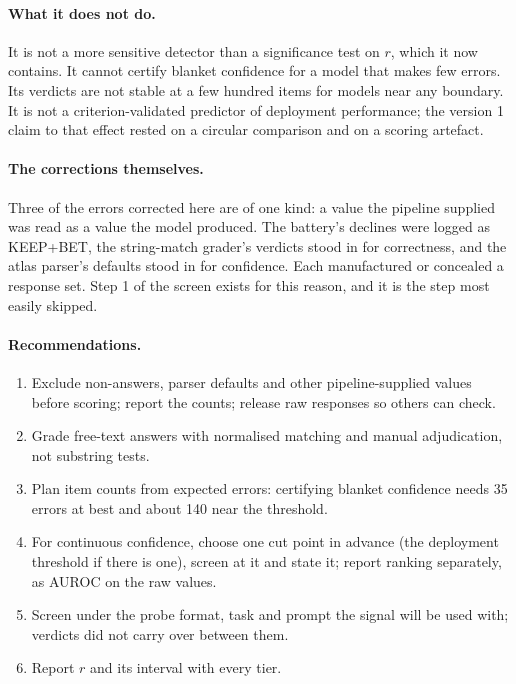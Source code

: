 \documentclass[11pt,a4paper]{article}
\begin{document}
\paragraph{What it does not do.} It is not a more sensitive detector than a significance test on $r$, which it now contains. It cannot certify blanket confidence for a model that makes few errors. Its verdicts are not stable at a few hundred items for models near any boundary. It is not a criterion-validated predictor of deployment performance; the version 1 claim to that effect rested on a circular comparison and on a scoring artefact.

\paragraph{The corrections themselves.} Three of the errors corrected here are of one kind: a value the pipeline supplied was read as a value the model produced. The battery's declines were logged as KEEP+BET, the string-match grader's verdicts stood in for correctness, and the atlas parser's defaults stood in for confidence. Each manufactured or concealed a response set. Step 1 of the screen exists for this reason, and it is the step most easily skipped.

\paragraph{Recommendations.}
\begin{enumerate}
\item Exclude non-answers, parser defaults and other pipeline-supplied values before scoring; report the counts; release raw responses so others can check.
\item Grade free-text answers with normalised matching and manual adjudication, not substring tests.
\item Plan item counts from expected errors: certifying blanket confidence needs 35 errors at best and about 140 near the threshold.
\item For continuous confidence, choose one cut point in advance (the deployment threshold if there is one), screen at it and state it; report ranking separately, as AUROC on the raw values.
\item Screen under the probe format, task and prompt the signal will be used with; verdicts did not carry over between them.
\item Report $r$ and its interval with every tier.
\end{enumerate}
\end{document}
